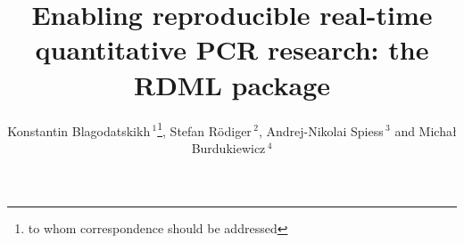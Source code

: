 \documentclass{bioinfo}
\begin{document}
\title[RDML]{Enabling reproducible real-time quantitative PCR research: the RDML package}
\author[Blagodatskikh \textit{et~al}]{Konstantin Blagodatskikh\,$^{1}$\footnote{to whom correspondence should be addressed}, Stefan R\"{o}diger\,$^{2}$, Andrej-Nikolai Spiess\,$^{3}$ and Micha\l{} Burdukiewicz\,$^{4}$} 

\address{$^{1}$Evrogen JSC, Moscow, Russia\\ 
$^{2}$Institute of Biotechnology, Brandenburg University of Technology Cottbus--Senftenberg, Senftenberg, Germany\\ 
$^{3}$University Medical Center Hamburg-Eppendorf, Hamburg, Germany\\
$^{4}$Department of Genomics, Faculty of Biotechnology, University of Wroc\l{}aw, Wroc\l{}aw 
}

\maketitle
\end{document}
